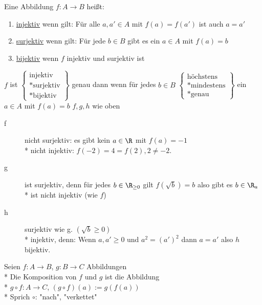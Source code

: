 Eine Abbildung $f: A \to B$ heißt:
\begin{enumerate}
\item{\ul{injektiv} wenn gilt: Für alle $a, a' \in A$ mit $f(a) = f(a')$ ist auch $a = a'$}
\item{\ul{surjektiv} wenn gilt: Für jede $b\in B$ gibt es ein $a\in A$ mit $f(a)=b$}
\item{\ul{bijektiv} wenn $f$ injektiv und surjektiv ist}
\end{enumerate}
%
%
%
\bem
$f$ ist $\left\{
\begin{array}{c}
\text{injektiv}\\*
\text{surjektiv}\\*
\text{bijektiv}
\end{array}
 \right\}$ genau dann wenn für jedes $b \in B$ $\left\{\begin{array}{c} \text{höchstens}\\* \text{mindestens}\\*
 \text{genau}
 \end{array} \right\}$ ein $a \in A$ mit $f(a) = b$
%
\bsp
$f,g,h$ wie oben
\begin{description}
\item[f]{
\hspace{5.5mm}nicht surjektiv: es gibt kein $a\in\R$ mit $f(a)=-1$\\*
nicht injektiv: $f(-2)=4=f(2), 2\neq -2.$}
%
\item[g]{
\hspace{5mm}ist surjektiv, denn für jedes $b \in \R_{\geq 0}$ gilt $f( \sqrt{b} ) = b$ also gibt es $b \in \R_a$\\*
 ist nicht injektiv (wie $f$)}
%
\item[h]{
\hspace{5mm}surjektiv wie g. $\left(\sqrt{b} \geq 0\right)$\\*
injektiv, denn: Wenn $a, a' \geq 0$ und $a^2 = (a')^2$ dann $a = a'$ also $h$ bijektiv.}
\end{description}

Seien $f:A→B$, $g:B→C$ Abbildungen\\*
Die Komposition von $f$ und $g$ ist die Abbildung\\*
$g \circ  f: A→C$, $(g \circ f)(a):=g(f(a))$\\*
Sprich $\circ$: "nach", "verkettet"

